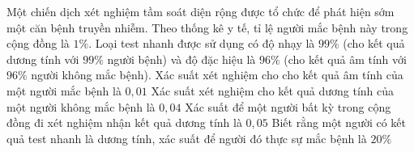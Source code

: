 \begin{ex}%
	Một chiến dịch xét nghiệm tầm soát diện rộng được tổ chức để phát hiện sớm một căn bệnh truyền nhiễm. Theo thống kê y tế, tỉ lệ người mắc bệnh này trong cộng đồng là $1\%$. Loại test nhanh được sử dụng có độ nhạy là $99\%$ (cho kết quả dương tính với $99\%$ người bệnh) và độ đặc hiệu là $96\%$ (cho kết quả âm tính với $96\%$ người không mắc bệnh).
	\choiceTF
	{\True Xác suất xét nghiệm cho cho kết quả âm tính của một người mắc bệnh là $0{,}01$}
	{\True Xác suất xét nghiệm cho kết quả dương tính của một người không mắc bệnh là $0{,}04$}
	{Xác suất để một người bất kỳ trong cộng đồng đi xét nghiệm nhận kết quả dương tính là $0{,}05$}
	{\True Biết rằng một người có kết quả test nhanh là dương tính, xác suất để người đó thực sự mắc bệnh là $20\%$}
\end{ex}
